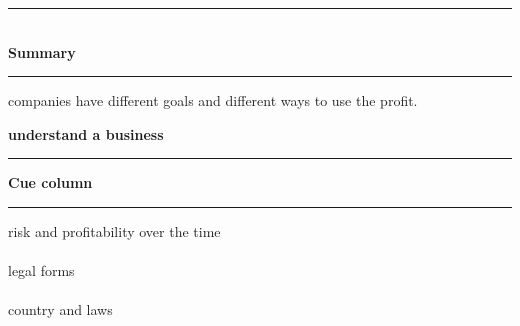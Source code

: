 \documentclass[12pt,a4paper]{report}
\begin{document}
\noindent\rule{\textwidth}{0.4pt}\\[0.5em]
\textbf{Summary}\\[0.5em]
    \rule{\linewidth}{0.4pt}
companies have different goals and different ways to use the profit. 


\newpage
\thispagestyle{empty}
\begin{center}
    {\Large\textbf{understand a business}}\\[0.5em]
    \rule{\textwidth}{0.4pt}
\end{center}

\noindent
\begin{minipage}[t]{0.27\textwidth}
    \textbf{Cue column}\\[0.5em]
    \rule{\linewidth}{0.4pt}
    risk and profitability over the time
        \\\\
        legal forms
        \\\\
        country and laws
\end{minipage}%
\hfill
\end{document}
